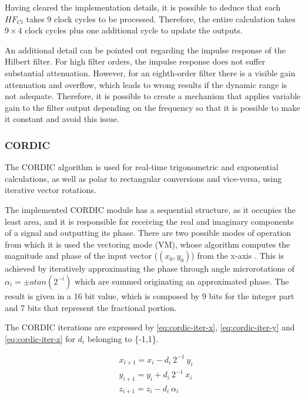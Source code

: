 Having cleared the implementation details, it is possible to deduce that each $HF_{Ci}$ takes 9 clock cycles to be processed. Therefore, the entire calculation takes $9 \times 4$ clock cycles plus one additional cycle to update the outputs.

An additional detail can be pointed out regarding the impulse response of the Hilbert filter. For high filter orders, the impulse response does not suffer substantial attenuation. However, for an eighth-order filter there is a visible gain attenuation and overflow, which leads to wrong results if the dynamic range is not adequate. Therefore, it is possible to create a mechanism that applies variable gain to the filter output depending on the frequency so that it is possible to make it constant and avoid this issue.

\subsubsection{CORDIC}

The CORDIC algorithm is used for real-time trigonometric and exponential calculations, as well as polar to rectangular conversions and vice-versa, using iterative vector rotations. 

The implemented CORDIC module has a sequential structure, as it occupies the least area, and it is responsible for receiving the real and imaginary components of a signal and outputting its phase. There are two possible modes of operation from which it is used the vectoring mode (VM), whose algorithm computes the magnitude and phase of the input vector ($(x_0, y_0)$) from the x-axis \cite{cordic-def}. This is achieved by iteratively approximating the phase through angle microrotations of $\alpha_i = \pm atan(2^{-i})$ which are summed originating an approximated phase. The result is given in a 16 bit value, which is composed by 9 bits for the integer part and 7 bits that represent the fractional portion. 

The CORDIC iterations are expressed by \ref{eq:cordic-iter-x}, \ref{eq:cordic-iter-y} and \ref{eq:cordic-iter-z} for $d_i$ belonging to \{-1,1\}.

\begin{eqnarray}
& x_{i+1} = x_i - d_i \ 2^{-1} \ y_i
\label{eq:cordic-iter-x}  \\
& y_{i+1} = y_i + d_i \ 2^{-1} \ x_i
\label{eq:cordic-iter-y} \\
& z_{i+1} = z_i - d_i \ \alpha_i
\label{eq:cordic-iter-z}
\end{eqnarray}

